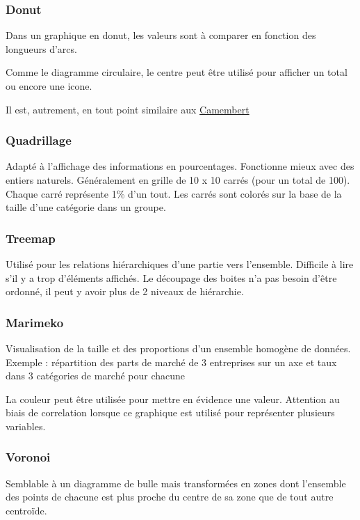 \documentclass[a4paper,12pt]{article}
\begin{document}
\begin{multicols}{2}
\subsubsection*{Donut}
\label{sec:org7fa17d8}
Dans un graphique en donut, les valeurs sont à comparer en fonction des longueurs d'arcs.

Comme le diagramme circulaire, le centre peut être utilisé pour afficher un total ou encore une icone. \autocite{alansmithLexiqueVisuel}

Il est, autrement, en tout point similaire aux \hyperref[sec:org0fecd7e]{Camembert}
\subsubsection*{Quadrillage}
\label{sec:org42bd9ff}
Adapté à l'affichage des informations en pourcentages. Fonctionne mieux avec des entiers naturels. \autocite{alansmithLexiqueVisuel} Généralement en grille de 10 x 10 carrés (pour un total de 100). Chaque carré représente 1\% d'un tout. Les carrés sont colorés sur la base de la taille d'une catégorie dans un groupe. \autocite{mikeyiHowChooseRight2020}
\subsubsection*{Treemap}
\label{sec:org9aec09a}
Utilisé pour les relations hiérarchiques d'une partie vers l'ensemble. Difficile à lire s'il y a trop d'éléments affichés. \autocite{alansmithLexiqueVisuel}
Le découpage des boites n'a pas besoin d'être ordonné, il peut y avoir plus de 2 niveaux de hiérarchie. \autocite{mikeyiHowChooseRight2020}
\subsubsection*{Marimeko}
\label{sec:orgcbb2097}
Visualisation de la taille et des proportions d'un ensemble homogène de données. \autocite{alansmithLexiqueVisuel}
Exemple : répartition des parts de marché de 3 entreprises sur un axe et taux dans 3 catégories de marché pour chacune

La couleur peut être utilisée pour mettre en évidence une valeur. \autocite{jonathanschwabishComparingCategories2021} Attention au biais de correlation lorsque ce graphique est utilisé pour représenter plusieurs variables. \autocite{jonathanschwabishComparingCategories2021}
\subsubsection*{Voronoi}
\label{sec:org2ac76f2}
Semblable à un diagramme de bulle mais transformées en zones dont l'ensemble des points de chacune est plus proche du centre de sa zone que de tout autre centroïde. \autocite{alansmithLexiqueVisuel}


\end{multicols}
\end{document}
